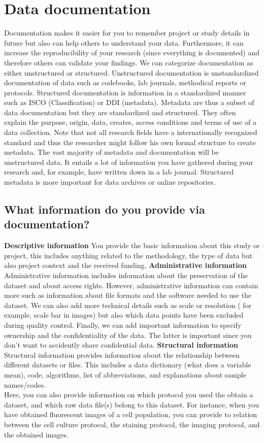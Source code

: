 \chapter{Data documentation}
Documentation makes it easier for you to remember project or study details in future but also can help others to understand your data. Furthermore, it can increase the reproducibility of your research (since everything is documented) and therefore others can validate your findings. 
We can categorize documentation as either unstructured or structured. Unstructured documentation is unstandardized documentation of data such as codebooks, lab journals, methodical reports or protocols. Structured documentation is information in a standardized manner such as ISCO (Classification) or DDI (metadata).
\whiteline 
Metadata are thus a subset of data documentation but they are standardized and structured. They often explain the purpose, origin, data, creates, access conditions and terms of use of a data collection.  Note that not all research fields have a internationally recognized standard and thus the researcher might follow his own formal structure to create metadata.
\whiteline
The vast majority of metadata and documentation will be unstructured data. It entails a lot of information you have gathered during your research and, for example, have written down in a lab journal. Structured metadata is more important for data archives or online repositories. 
\section{What information do you provide via documentation?}
\whiteline
\textbf{Descriptive information}
\whiteline
You provide the basic information about this study or project, this includes anything related to the methodology, the type of data but also project context and the received funding. \cite{KULeuven}
\whiteline
\textbf{Administrative information}
\whiteline
Administrative information includes information about the preservation of the dataset and about access rights. However, administrative information can contain more such as information about file formats and the software needed to use the dataset. We can also add more technical details such as scale or resolution ( for example, scale bar in images) but also which data points have been excluded during quality control. Finally, we can add important information to specify ownership and the confidentiality of the data. The latter is important since you don’t want to accidently share confidential data. \cite{KULeuven}
\whiteline 
\textbf{Structural information}
\whiteline
Structural information provides information about the relationship between different datasets or files. This includes a data dictionary (what does a variable mean), code, algorithms, list of abbreviations, and explanations about sample names/codes.\cite{KULeuven} \\
Here, you can also provide information on which protocol you used the obtain a dataset, and which raw data file(s) belong to this dataset. For instance, when you have obtained fluorescent images of a cell population, you can provide to relation between the cell culture protocol, the staining protocol, the imaging protocol, and the obtained images.

